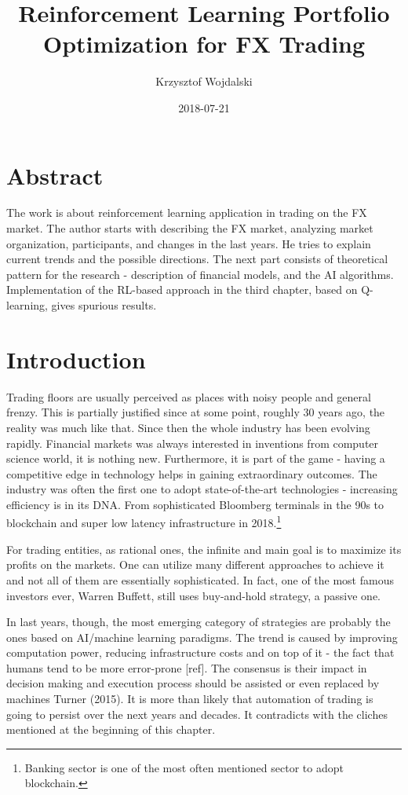 \documentclass[]{article}
\title{Reinforcement Learning Portfolio Optimization for FX Trading}
\author{Krzysztof Wojdalski}
\date{2018-07-21}
\let\rmarkdownfootnote\footnote%
\def\footnote{\protect\rmarkdownfootnote}
\begin{document}
\maketitle

{
\setcounter{tocdepth}{3}
\tableofcontents
}
\theoremstyle{definition} \newtheorem{definition}{Definition} \newpage

\section{Abstract}\label{abstract}

The work is about reinforcement learning application in trading on the
FX market. The author starts with describing the FX market, analyzing
market organization, participants, and changes in the last years. He
tries to explain current trends and the possible directions. The next
part consists of theoretical pattern for the research - description of
financial models, and the AI algorithms. Implementation of the RL-based
approach in the third chapter, based on Q-learning, gives spurious
results.

\section{Introduction}\label{introduction}

Trading floors are usually perceived as places with noisy people and
general frenzy. This is partially justified since at some point, roughly
30 years ago, the reality was much like that. Since then the whole
industry has been evolving rapidly. Financial markets was always
interested in inventions from computer science world, it is nothing new.
Furthermore, it is part of the game - having a competitive edge in
technology helps in gaining extraordinary outcomes. The industry was
often the first one to adopt state-of-the-art technologies - increasing
efficiency is in its DNA. From sophisticated Bloomberg terminals in the
90s to blockchain and super low latency infrastructure in
2018.\footnote{Banking sector is one of the most often mentioned sector
  to adopt blockchain.}

For trading entities, as rational ones, the infinite and main goal is to
maximize its profits on the markets. One can utilize many different
approaches to achieve it and not all of them are essentially
sophisticated. In fact, one of the most famous investors ever, Warren
Buffett, still uses buy-and-hold strategy, a passive one.

In last years, though, the most emerging category of strategies are
probably the ones based on AI/machine learning paradigms. The trend is
caused by improving computation power, reducing infrastructure costs and
on top of it - the fact that humans tend to be more error-prone
{[}ref{]}. The consensus is their impact in decision making and
execution process should be assisted or even replaced by machines Turner
(2015). It is more than likely that automation of trading is going to
persist over the next years and decades. It contradicts with the cliches
mentioned at the beginning of this chapter.
\end{document}
